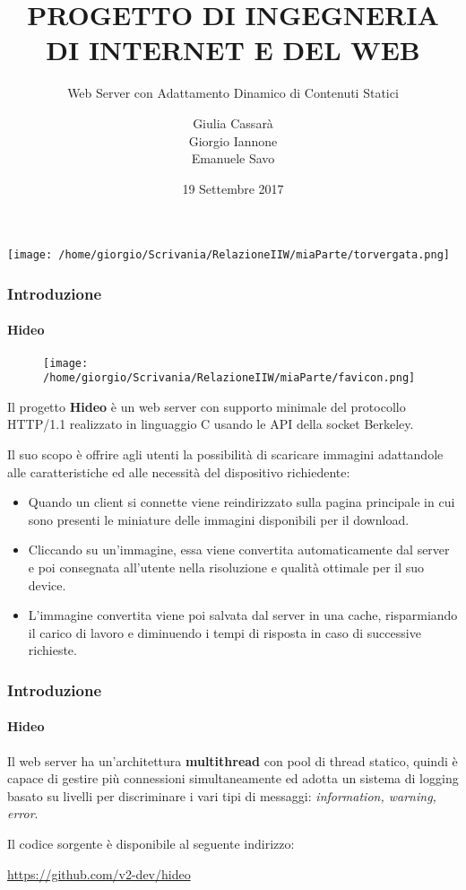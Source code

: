 \documentclass{beamer}
\title{\textbf{PROGETTO DI INGEGNERIA DI INTERNET E DEL WEB}}
\subtitle{Web Server con Adattamento Dinamico di Contenuti Statici}
\author{Giulia Cassarà \\ 
 \medskip
Giorgio Iannone
\medskip
\\ Emanuele Savo
}
\date{19 Settembre 2017}
\begin{document}
\begin{frame}
\centerline{\texttt{[image: /home/giorgio/Scrivania/RelazioneIIW/miaParte/torvergata.png]}\hspace{2em}}
\maketitle


\end{frame}


\begin{frame}
\frametitle{Introduzione}
\framesubtitle{Hideo}
\begin{figure}
	\texttt{[image: /home/giorgio/Scrivania/RelazioneIIW/miaParte/favicon.png]}
\end{figure}

Il progetto \textbf{Hideo} è un web server con supporto minimale del protocollo
HTTP/1.1 realizzato in linguaggio C usando le API della socket Berkeley.

\medskip

Il suo scopo è offrire agli utenti la possibilità di scaricare immagini adattandole alle caratteristiche ed alle necessità del
dispositivo richiedente:

\footnotesize
\begin{itemize}
\item Quando un client si connette viene reindirizzato sulla pagina principale in cui sono presenti le miniature delle immagini disponibili per il
download.
\item Cliccando su un’immagine, essa viene convertita automaticamente dal
server e poi consegnata all’utente nella risoluzione e qualità ottimale per il suo
device.
\item L’immagine convertita viene poi salvata dal server in una cache,
risparmiando il carico di lavoro e diminuendo i tempi di risposta in caso di
successive richieste.
\end{itemize}
\normalsize
\end{frame}


\begin{frame}
\frametitle{Introduzione}
\framesubtitle{Hideo}
Il web server ha un’architettura \textbf{multithread} con pool di thread statico, quindi è
capace di gestire più connessioni simultaneamente ed adotta un sistema di logging
basato su livelli per discriminare i vari tipi di messaggi: \textit{information, warning,
error}.


\medskip

Il codice sorgente è disponibile al seguente indirizzo:

\medskip

\setlength{\parindent}{32pt} \href{https://github.com/v2-dev/hideo}{\color{blue}  https://github.com/v2-dev/hideo}


\end{frame}
\end{document}
